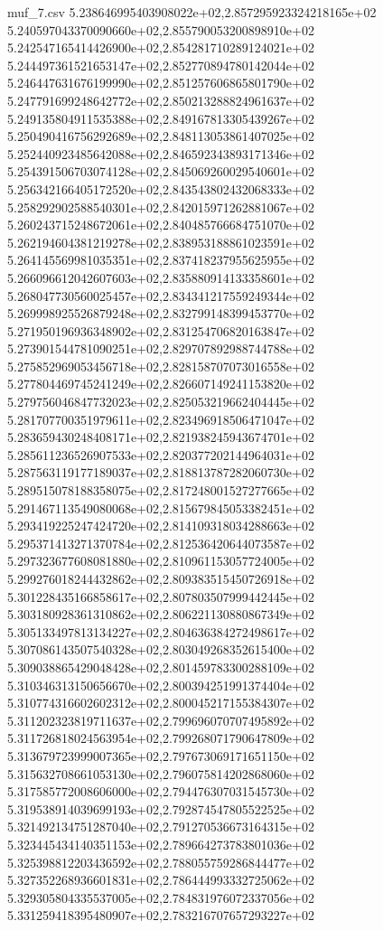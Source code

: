 \begin{filecontents*}{muf_7.csv}
5.238646995403908022e+02,2.857295923324218165e+02
5.240597043370090660e+02,2.855790053200898910e+02
5.242547165414426900e+02,2.854281710289124021e+02
5.244497361521653147e+02,2.852770894780142044e+02
5.246447631676199990e+02,2.851257606865801790e+02
5.247791699248642772e+02,2.850213288824961637e+02
5.249135804911535388e+02,2.849167813305439267e+02
5.250490416756292689e+02,2.848113053861407025e+02
5.252440923485642088e+02,2.846592343893171346e+02
5.254391506703074128e+02,2.845069260029540601e+02
5.256342166405172520e+02,2.843543802432068333e+02
5.258292902588540301e+02,2.842015971262881067e+02
5.260243715248672061e+02,2.840485766684751070e+02
5.262194604381219278e+02,2.838953188861023591e+02
5.264145569981035351e+02,2.837418237955625955e+02
5.266096612042607603e+02,2.835880914133358601e+02
5.268047730560025457e+02,2.834341217559249344e+02
5.269998925526879248e+02,2.832799148399453770e+02
5.271950196936348902e+02,2.831254706820163847e+02
5.273901544781090251e+02,2.829707892988744788e+02
5.275852969053456718e+02,2.828158707073016558e+02
5.277804469745241249e+02,2.826607149241153820e+02
5.279756046847732023e+02,2.825053219662404445e+02
5.281707700351979611e+02,2.823496918506471047e+02
5.283659430248408171e+02,2.821938245943674701e+02
5.285611236526907533e+02,2.820377202144964031e+02
5.287563119177189037e+02,2.818813787282060730e+02
5.289515078188358075e+02,2.817248001527277665e+02
5.291467113549080068e+02,2.815679845053382451e+02
5.293419225247424720e+02,2.814109318034288663e+02
5.295371413271370784e+02,2.812536420644073587e+02
5.297323677608081880e+02,2.810961153057724005e+02
5.299276018244432862e+02,2.809383515450726918e+02
5.301228435166858617e+02,2.807803507999442445e+02
5.303180928361310862e+02,2.806221130880867349e+02
5.305133497813134227e+02,2.804636384272498617e+02
5.307086143507540328e+02,2.803049268352615400e+02
5.309038865429048428e+02,2.801459783300288109e+02
5.310346313150656670e+02,2.800394251991374404e+02
5.310774316602602312e+02,2.800045217155384307e+02
5.311202323819711637e+02,2.799696070707495892e+02
5.311726818024563954e+02,2.799268071790647809e+02
5.313679723999007365e+02,2.797673069171651150e+02
5.315632708661053130e+02,2.796075814202868060e+02
5.317585772008606000e+02,2.794476307031545730e+02
5.319538914039699193e+02,2.792874547805522525e+02
5.321492134751287040e+02,2.791270536673164315e+02
5.323445434140351153e+02,2.789664273783801036e+02
5.325398812203436592e+02,2.788055759286844477e+02
5.327352268936601831e+02,2.786444993332725062e+02
5.329305804335537005e+02,2.784831976072337056e+02
5.331259418395480907e+02,2.783216707657293227e+02

\end{filecontents*}
